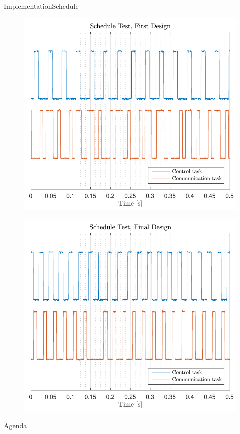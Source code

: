 \begin{frame}{Implementation}{Schedule}
\hspace*{-.1cm}
  \begin{minipage}{0.49\linewidth}
    \begin{figure}[H]
      \includegraphics[width=1\linewidth]{figures/scheduleTest}
    \end{figure}
  \end{minipage}\hspace*{.2cm}
  \begin{minipage}{0.49\linewidth}
    \begin{figure}[H]
      \includegraphics[width=1\linewidth]{figures/scheduleTestNew}
    \end{figure}                    
  \end{minipage}
\end{frame}
    
\begin{frame}{Agenda}{}
    \tableofcontents
\end{frame}

